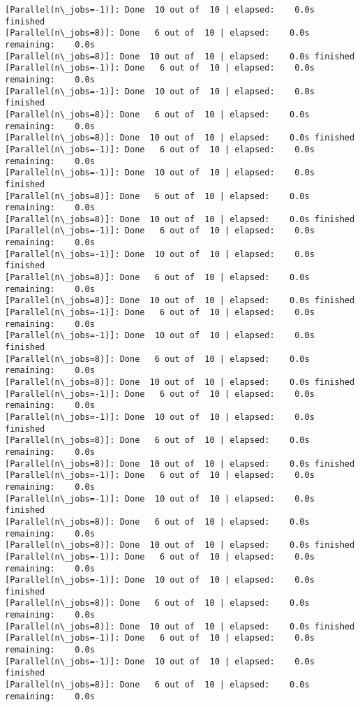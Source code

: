 \documentclass[11pt]{article}
\begin{document}
\begin{Verbatim}[commandchars=\\\{\}]
[Parallel(n\_jobs=-1)]: Done  10 out of  10 | elapsed:    0.0s finished
[Parallel(n\_jobs=8)]: Done   6 out of  10 | elapsed:    0.0s remaining:    0.0s
[Parallel(n\_jobs=8)]: Done  10 out of  10 | elapsed:    0.0s finished
[Parallel(n\_jobs=-1)]: Done   6 out of  10 | elapsed:    0.0s remaining:    0.0s
[Parallel(n\_jobs=-1)]: Done  10 out of  10 | elapsed:    0.0s finished
[Parallel(n\_jobs=8)]: Done   6 out of  10 | elapsed:    0.0s remaining:    0.0s
[Parallel(n\_jobs=8)]: Done  10 out of  10 | elapsed:    0.0s finished
[Parallel(n\_jobs=-1)]: Done   6 out of  10 | elapsed:    0.0s remaining:    0.0s
[Parallel(n\_jobs=-1)]: Done  10 out of  10 | elapsed:    0.0s finished
[Parallel(n\_jobs=8)]: Done   6 out of  10 | elapsed:    0.0s remaining:    0.0s
[Parallel(n\_jobs=8)]: Done  10 out of  10 | elapsed:    0.0s finished
[Parallel(n\_jobs=-1)]: Done   6 out of  10 | elapsed:    0.0s remaining:    0.0s
[Parallel(n\_jobs=-1)]: Done  10 out of  10 | elapsed:    0.0s finished
[Parallel(n\_jobs=8)]: Done   6 out of  10 | elapsed:    0.0s remaining:    0.0s
[Parallel(n\_jobs=8)]: Done  10 out of  10 | elapsed:    0.0s finished
[Parallel(n\_jobs=-1)]: Done   6 out of  10 | elapsed:    0.0s remaining:    0.0s
[Parallel(n\_jobs=-1)]: Done  10 out of  10 | elapsed:    0.0s finished
[Parallel(n\_jobs=8)]: Done   6 out of  10 | elapsed:    0.0s remaining:    0.0s
[Parallel(n\_jobs=8)]: Done  10 out of  10 | elapsed:    0.0s finished
[Parallel(n\_jobs=-1)]: Done   6 out of  10 | elapsed:    0.0s remaining:    0.0s
[Parallel(n\_jobs=-1)]: Done  10 out of  10 | elapsed:    0.0s finished
[Parallel(n\_jobs=8)]: Done   6 out of  10 | elapsed:    0.0s remaining:    0.0s
[Parallel(n\_jobs=8)]: Done  10 out of  10 | elapsed:    0.0s finished
[Parallel(n\_jobs=-1)]: Done   6 out of  10 | elapsed:    0.0s remaining:    0.0s
[Parallel(n\_jobs=-1)]: Done  10 out of  10 | elapsed:    0.0s finished
[Parallel(n\_jobs=8)]: Done   6 out of  10 | elapsed:    0.0s remaining:    0.0s
[Parallel(n\_jobs=8)]: Done  10 out of  10 | elapsed:    0.0s finished
[Parallel(n\_jobs=-1)]: Done   6 out of  10 | elapsed:    0.0s remaining:    0.0s
[Parallel(n\_jobs=-1)]: Done  10 out of  10 | elapsed:    0.0s finished
[Parallel(n\_jobs=8)]: Done   6 out of  10 | elapsed:    0.0s remaining:    0.0s
[Parallel(n\_jobs=8)]: Done  10 out of  10 | elapsed:    0.0s finished
[Parallel(n\_jobs=-1)]: Done   6 out of  10 | elapsed:    0.0s remaining:    0.0s
[Parallel(n\_jobs=-1)]: Done  10 out of  10 | elapsed:    0.0s finished
[Parallel(n\_jobs=8)]: Done   6 out of  10 | elapsed:    0.0s remaining:    0.0s

\end{Verbatim}
\end{document}
